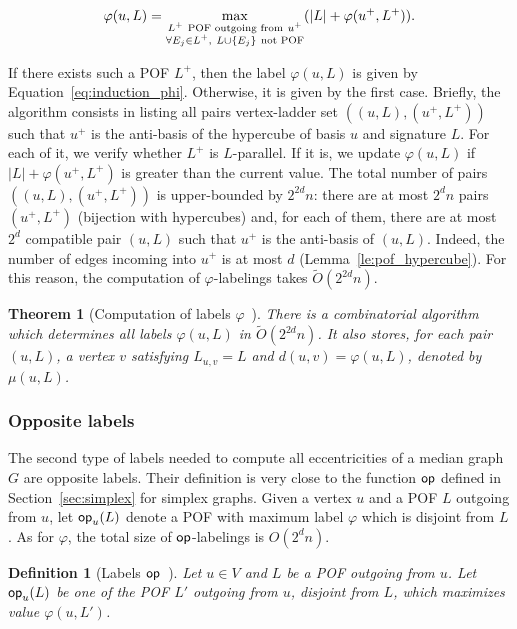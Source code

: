 \documentclass{article}
\newtheorem{theorem}{Theorem}
\newtheorem{definition}{Definition}
\newcommand{\set}[1]{\left\{ #1 \right\}}
\newcommand{\card}[1]{\left| #1 \right|}
\newcommand{\opp}{\mbox{\textsf{op}}}
\begin{document}
\begin{equation}
    \varphi(u,L) = \max\limits_{\substack{L^+ ~\mbox{\scriptsize{POF outgoing from}}~ u^+ \\ \forall E_j \in L^+,~ L \cup \set{E_j} ~\mbox{\scriptsize{not POF}}}} (\card{L} + \varphi(u^+,L^+)).
\label{eq:induction_phi}
\end{equation}

If there exists such a POF $L^+$, then the label $\varphi(u,L)$ is given by Equation~\eqref{eq:induction_phi}. Otherwise, it is given by the first case. Briefly, the algorithm consists in listing all pairs vertex-ladder set $((u,L),(u^+,L^+))$ such that $u^+$ is the anti-basis of the hypercube of basis $u$ and signature $L$. For each of it, we verify whether $L^+$ is $L$-parallel. If it is, we update $\varphi(u,L)$ if $\card{L} + \varphi(u^+,L^+)$ is greater than the current value. The total number of pairs $((u,L),(u^+,L^+))$ is upper-bounded by $2^{2d}n$: there are at most $2^dn$ pairs $(u^+,L^+)$ (bijection with hypercubes) and, for each of them, there are at most $2^d$ compatible pair $(u,L)$ such that $u^+$ is the anti-basis of $(u,L)$. Indeed, the number of edges incoming into $u^+$ is at most $d$ (Lemma~\ref{le:pof_hypercube}). For this reason, the computation of $\varphi$-labelings takes $\tilde{O}(2^{2d}n)$.

\begin{theorem}[Computation of labels $\varphi$~\cite{BeHa21}]
There is a combinatorial algorithm which determines all labels $\varphi(u,L)$ in $\tilde{O}(2^{2d}n)$. It also stores, for each pair $(u,L)$, a vertex $v$ satisfying $L_{u,v} = L$ and $d(u,v) = \varphi(u,L)$, denoted by $\mu(u,L)$.
\label{th:compute_phi}
\end{theorem}

\subsubsection{Opposite labels}

The second type of labels needed to compute all eccentricities of a median graph $G$ are opposite labels. Their definition is very close to the function $\opp$ defined in Section~\ref{sec:simplex} for simplex graphs. Given a vertex $u$ and a POF $L$ outgoing from $u$, let $\opp_u(L)$ denote a POF with maximum label $\varphi$ which is disjoint from $L$. As for $\varphi$, the total size of $\opp$-labelings is $O(2^dn)$.

\begin{definition}[Labels $\opp$~\cite{BeHa21}]
Let $u \in V$ and $L$ be a POF outgoing from $u$. Let $\opp_u(L)$ be one of the POF $L'$ outgoing from $u$, disjoint from $L$, which maximizes value $\varphi(u,L')$.
\end{definition}
\end{document}
